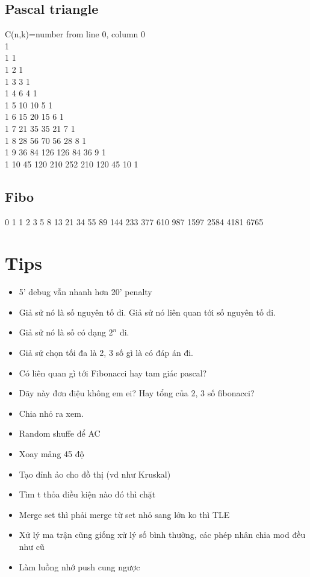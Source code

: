 \documentclass[A4 paper, 12pt, oneside, landscape]{article}
\begin{document}
\begin{multicols}{2}
	\subsection{Pascal triangle}
C(n,k)=number from line 0, column 0\\
1\\
1 1\\
1 2 1\\ 
1 3 3 1\\ 
1 4 6 4 1\\ 
1 5 10 10 5 1\\ 
1 6 15 20 15 6 1\\ 
1 7 21 35 35 21 7 1\\
1 8 28 56 70 56 28 8 1\\ 
1 9 36 84 126 126 84 36 9 1\\
1 10 45 120 210 252 210 120 45 10 1
	\subsection{Fibo}
	0 1 1 2 3 5 8 13 21 34 55 89 144 233 377 610 987 1597 2584 4181 6765
	\section{Tips}
	\begin{itemize}[topsep=0pt, partopsep=0pt, itemsep=0pt]
	\item 5' debug vẫn nhanh hơn 20' penalty
	\item Giả sử nó là số nguyên tố đi. Giả sử nó liên quan tới số nguyên tố đi.
	\item Giả sử nó là số có dạng $2^n$ đi.
	\item Giả sử chọn tối đa là 2, 3 số gì là có đáp án đi.
	\item Có liên quan gì tới Fibonacci hay tam giác pascal?
	\item Dãy này đơn điệu không em ei? Hay tổng của 2, 3 số fibonacci?
	\item Chia nhỏ ra xem.
	\item Random shuffe để AC
	\item Xoay mảng 45 độ
	\item Tạo đỉnh ảo cho đồ thị (vd như Kruskal)
	\item Tìm t thỏa điều kiện nào đó thì chặt
	\item Merge set thì phải merge từ set nhỏ sang lớn ko thì TLE
	\item Xử lý ma trận cũng giống xử lý số bình thường, các phép nhân chia mod đều như cũ
	\item Làm luồng nhớ push cung ngược
	\end{itemize}

	\end{multicols}
\end{document}
